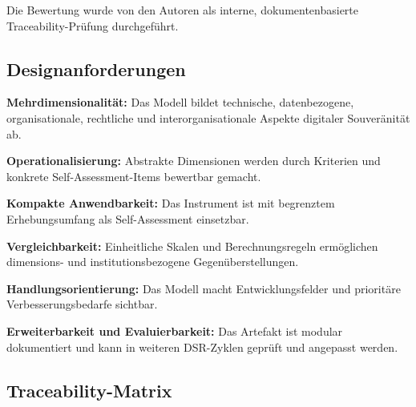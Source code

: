 \documentclass[10pt,a4paper]{article}
\begin{document}
Die Bewertung wurde von den Autoren als interne, dokumentenbasierte Traceability-Prüfung durchgeführt.

\subsection{Designanforderungen}

\begin{description}[style=nextline,leftmargin=25mm,labelwidth=21mm,font=\sffamily\bfseries\color{DeepNavy}]
  \item[DA1] \textbf{Mehrdimensionalität:} Das Modell bildet technische, datenbezogene, organisationale, rechtliche und interorganisationale Aspekte digitaler Souveränität ab.
  \item[DA2] \textbf{Operationalisierung:} Abstrakte Dimensionen werden durch Kriterien und konkrete Self-Assessment-Items bewertbar gemacht.
  \item[DA3] \textbf{Kompakte Anwendbarkeit:} Das Instrument ist mit begrenztem Erhebungsumfang als Self-Assessment einsetzbar.
  \item[DA4] \textbf{Vergleichbarkeit:} Einheitliche Skalen und Berechnungsregeln ermöglichen dimensions- und institutionsbezogene Gegenüberstellungen.
  \item[DA5] \textbf{Handlungsorientierung:} Das Modell macht Entwicklungsfelder und prioritäre Verbesserungsbedarfe sichtbar.
  \item[DA6] \textbf{Erweiterbarkeit und Evaluierbarkeit:} Das Artefakt ist modular dokumentiert und kann in weiteren DSR-Zyklen geprüft und angepasst werden.
\end{description}

\subsection{Traceability-Matrix}
\end{document}

